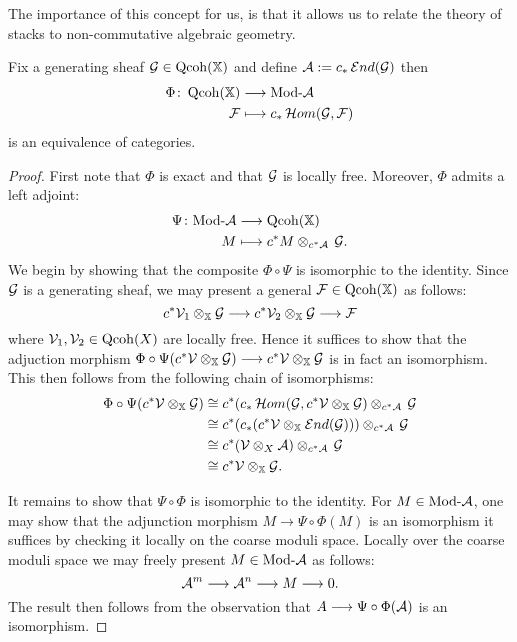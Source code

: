 \documentclass[12pt]{amsart}
\begin{document}
The importance of this concept for us, is that it allows us to relate the theory of stacks to non-commutative algebraic geometry. 
\begin{proposition} \label{prop:Morita}
Fix a generating sheaf $\mathcal{G} \in \operatorname{Qcoh}(\mathbb{X})$ and define $\mathcal{A} := c_* \mathop{{\mathcal{E}}nd}\nolimits (\mathcal{G})$ then 
\begin{align*}
\Phi \colon \operatorname{Qcoh} (\mathbb{X}) &\longrightarrow \textup{Mod-}\mathcal{A} \\
 \mathcal{F} & \longmapsto c_* \mathop{{\mathcal{H}}om}\nolimits(\mathcal{G}, \mathcal{F})
\end{align*}
is an equivalence of categories.
\end{proposition}

\begin{proof}
First note that $\Phi$ is exact and that $\mathcal{G}$ is locally free. Moreover, $\Phi$ admits a left adjoint:
\begin{align*}
\Psi \colon \textup{Mod-}\mathcal{A} &\longrightarrow \operatorname{Qcoh} (\mathbb{X}) \\
 M & \longmapsto c^*M \otimes_{c^* \mathcal{A}} \, \mathcal{G}.
\end{align*}
We begin by showing that the composite $\Phi \circ \Psi$ is isomorphic to the identity. 
Since $\mathcal{G}$ is a generating sheaf, we may present a general $\mathcal{F} \in \operatorname{Qcoh}(\mathbb{X})$ as follows: $$c^* \mathcal{V}_1 \otimes_{\mathbb{X}} \mathcal{G} \longrightarrow c^* \mathcal{V}_2 \otimes_{\mathbb{X}} \mathcal{G} \longrightarrow \mathcal{F}$$ where $\mathcal{V}_1, \mathcal{V}_2 \in \operatorname{Qcoh}(X)$ are locally free. 
Hence it suffices to show that the adjuction morphism $\Phi \circ \Psi (c^* \mathcal{V} \otimes_{\mathbb{X}} \mathcal{G}) \longrightarrow c^* \mathcal{V} \otimes_{\mathbb{X}} \mathcal{G}$ is in fact an isomorphism.
This then follows from the following chain of isomorphisms:
\begin{align*}
\Phi \circ \Psi (c^* \mathcal{V} \otimes_{\mathbb{X}} \mathcal{G}) &\cong c^*(c_* \mathop{{\mathcal{H}}om}\nolimits(\mathcal{G}, c^* \mathcal{V} \otimes_{\mathbb{X}} \mathcal{G}) \otimes_{c^* \mathcal{A}} \, \mathcal{G} \\
& \cong c^*(c_* (c^* \mathcal{V} \otimes_{\mathbb{X}} \mathop{{\mathcal{E}}nd}\nolimits(\mathcal{G}))) \otimes_{c^* \mathcal{A}} \, \mathcal{G} \\
& \cong c^* (\mathcal{V} \otimes_X \mathcal{A}) \otimes_{c^* \mathcal{A}} \, \mathcal{G} \\
& \cong c^*\mathcal{V} \otimes_{\mathbb{X}} \mathcal{G}.
\end{align*}

It remains to show that $\Psi \circ \Phi$ is isomorphic to the identity.
For $M \in \textup{Mod-}\mathcal{A}$, one may show that the adjunction morphism $M \rightarrow \Psi \circ \Phi(M)$ is an isomorphism it suffices by checking it locally on the coarse moduli space. 
Locally over the coarse moduli space we may freely present $M \in \textup{Mod-}\mathcal{A}$ as follows: $$\mathcal{A}^m \longrightarrow \mathcal{A}^n \longrightarrow M \longrightarrow 0.$$ 
The result then follows from the observation that $A \longrightarrow \Psi \circ \Phi (\mathcal{A})$ is an isomorphism.
\end{proof}
\end{document}
